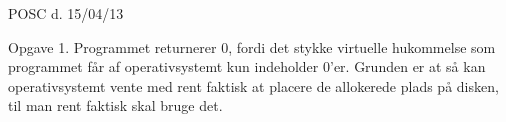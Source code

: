 POSC d. 15/04/13

Opgave 1.
Programmet returnerer 0, fordi det stykke virtuelle hukommelse som programmet får af operativsystemt kun indeholder 0'er. Grunden er at så kan operativsystemt vente med rent faktisk at placere de allokerede plads på disken, til man rent faktisk skal bruge det.


